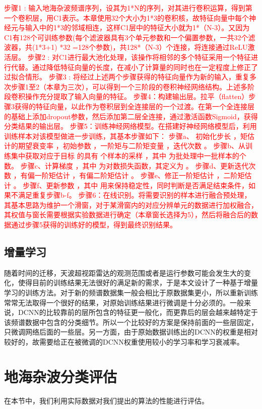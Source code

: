 \textcolor{red}{步骤1 : 输入地海杂波频谱序列，设其为1*N的序列，对其进行卷积运算，得到第一个卷积层，用C1表示。本章使用32个大小为1*3的卷积核，故特征向量中每个神经元与输入中的1*3的邻域相连，这样C1层中的特征大小就为1*（N-3）。又因为C1有128个可训练参数(每个滤波器具有3个单元参数和一个偏置参数，一共32个滤波器，共(1*3+1) *32 =128个参数)，共128*（N-3）个连接，将连接通过ReLU激活层。
步骤2 : 对C1进行最大池化处理，该操作将相邻的多个特征采用一个特征进行代替。通过降低特征向量的长度，在减小了计算量的同时也在一定程度上修正了过拟合情形。
步骤3 : 将经过上述两个步骤获得的特征向量作为新的输入，重复多次步骤1至2（本章为三次），可以得到一个三阶段的卷积神经网络结构。上述多阶段卷积操作充分提取了输入向量的特征。
步骤4：构建输出层。拉平（flatten）步骤3获得的特征向量，以此作为卷积层到全连接层的一个过渡。在第一个全连接层的基础上添加dropout参数，然后添加第二层全连接，通过激活函数Sigmoid，获得分类结果的输出层。
步骤5：训练神经网络模型。在搭建好神经网络模型后，利用训练样本对该模型做进一步训练，其基本步骤如下：
步骤a、 初始化步长 ，矩估计的期望衰变率 ，初始参数 ，一阶矩与二阶矩变量 ，迭代次数 。
步骤b、从训练集中获取对应于目标 的具有 个样本的采样 ，其中 为批处理中一批样本的个数。
步骤c、计算梯度  ，其中 为对数损失函数，其定义为 。
步骤d、更新迭代次数 ，有偏一阶矩估计 ，有偏二阶矩估计 。
步骤e、修正一阶矩估计 ，二阶矩估计 。
步骤f、更新参数  ，其中 用来保持稳定性，同时判断是否满足结束条件，如果不满足重复步骤b-f。
步骤6：在线识别。将需要识别的样本进行融合预处理，其基本思路为维护一个滑窗，对于某滑窗内的对应分辨单元的数据进行加权融合，其权值与窗长需要根据实验数据进行确定（本章窗长选择为5），然后将融合后的数据通过步骤5获得的训练好的模型，得到最终识别结果。}

\subsection{增量学习}
随着时间的迁移，天波超视距雷达的观测范围或者是运行参数可能会发生大的变化，使得目前的训练结果无法很好的满足新的需求，于是本文设计了一种基于增量学习的训练方法。对于新的频谱数据集一般会相比于原数据集更小，所以重新训练常常无法取得一个很好的结果，对原始训练结果进行微调是十分必须的。一般来说，DCNN的比较靠前的层所包含的特征更一般化，而更靠后的层会越来越特定于该频谱数据中包含的分类细节。所以一个比较好的方案是保持前面的一些层固定，只微调网络后面的一些层。另一方面，由于原始数据训练出的DCNN的权重是相对较好的，故需要给正在被微调的DCNN权重使用较小的学习率和学习衰减率。
\section{地海杂波分类评估}
在本节中，我们利用实际数据对我们提出的算法的性能进行评估。
